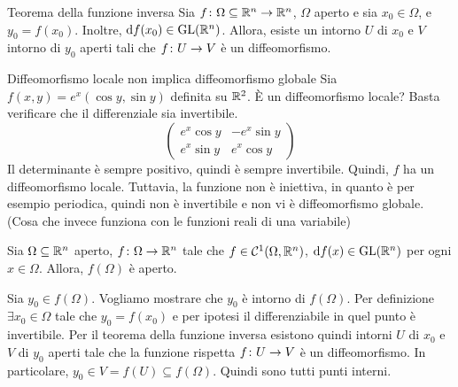 \documentclass[a4paper]{article}
\begin{document}
\begin{snippettheorem}{Teorema della funzione inversa}
    Sia \(f \colon \Omega \subseteq \mathbb{R}^n \to \mathbb{R}^n\),
    \(\Omega\) aperto e sia \(x_0 \in \Omega\), e \(y_0 = f(x_0)\).
    Inoltre, \(\text{d}f(x_0) \in \text{GL}(\mathbb{R}^n)\).
    Allora, esiste un intorno \(U\) di \(x_0\) e \(V\) intorno di \(y_0\)
    aperti tali che \(f \colon U \to V\)
    è un diffeomorfismo.
\end{snippettheorem}

\begin{snippetexample}{Diffeomorfismo locale non implica diffeomorfismo globale}
    Sia \(f(x,y) = e^x(\cos y, \sin y)\) definita su \(\mathbb{R}^2\).
    È un diffeomorfismo locale? Basta verificare che
    il differenziale sia invertibile.
    \[
        \begin{pmatrix}
            e^x \cos y & -e^x \sin y \\
            e^x \sin y & e^x \cos y
        \end{pmatrix}
    \]
    Il determinante è sempre positivo, quindi è sempre invertibile.
    Quindi, \(f\) ha un diffeomorfismo locale.
    Tuttavia, la funzione non è iniettiva, in quanto è per esempio periodica,
    quindi non è invertibile e non vi è diffeomorfismo globale.
    (Cosa che invece funziona con le funzioni reali di una variabile)
\end{snippetexample}

\begin{snippetcorollary}{}
    Sia \(\Omega \subseteq \mathbb{R}^n\) aperto,
    \(f \colon \Omega \to \mathbb{R}^n\) tale che \(f \in \mathcal{C}^1(\Omega, \mathbb{R}^n)\),
    \(\text{d}f(x) \in \text{GL}(\mathbb{R}^n)\) per ogni \(x\in \Omega\).
    Allora, \(f(\Omega)\) è aperto.
\end{snippetcorollary}

\begin{snippetproof}{}
    Sia \(y_0 \in f(\Omega)\).
    Vogliamo mostrare che \(y_0\) è intorno di \(f(\Omega)\).
    Per definizione \(\exists x_0 \in \Omega\) tale che \(y_0 = f(x_0)\)
    e per ipotesi il differenziabile in quel punto è invertibile.
    Per il teorema della funzione inversa esistono quindi
    intorni \(U\) di \(x_0\) e \(V\) di \(y_0\) aperti
    tale che la funzione rispetta \(f \colon U \to V\) è un diffeomorfismo.
    In particolare, \(y_0 \in V = f(U) \subseteq f(\Omega)\).
    Quindi sono tutti punti interni.
\end{snippetproof}
\end{document}
